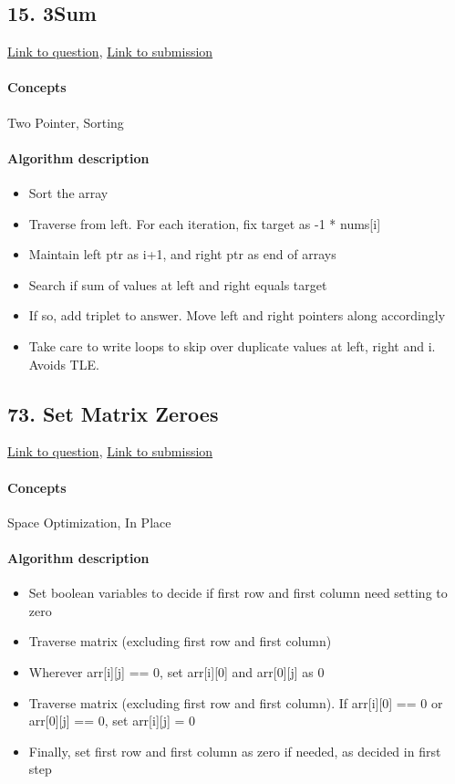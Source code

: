 \documentclass[11pt]{book}
\begin{document}
\subsection{15. 3Sum}
\href{https://leetcode.com/problems/3sum/}{Link to question},
\href{https://leetcode.com/submissions/detail/335882786/}{Link to submission}
\paragraph{Concepts}
Two Pointer, Sorting
\paragraph{Algorithm description}
\begin{itemize}
    \item Sort the array
    \item Traverse from left. For each iteration, fix target as -1 * nums[i]
    \item Maintain left ptr as i+1, and right ptr as end of arrays
    \item Search if sum of values at left and right equals target
    \item If so, add triplet to answer. Move left and right pointers along accordingly
    \item Take care to write loops to skip over duplicate values at left, right and i. Avoids TLE.
\end{itemize}

\subsection{73. Set Matrix Zeroes}
\href{https://leetcode.com/problems/set-matrix-zeroes/}{Link to question},
\href{https://leetcode.com/submissions/detail/335922950/}{Link to submission}
\paragraph{Concepts}
Space Optimization, In Place
\paragraph{Algorithm description}
\begin{itemize}
    \item Set boolean variables to decide if first row and first column need setting to zero
    \item Traverse matrix (excluding first row and first column)
    \item Wherever arr[i][j] == 0, set arr[i][0] and arr[0][j] as 0
    \item Traverse matrix (excluding first row and first column). If arr[i][0] == 0 or arr[0][j] == 0, set arr[i][j] = 0
    \item Finally, set first row and first column as zero if needed, as decided in first step
\end{itemize}
\end{document}
